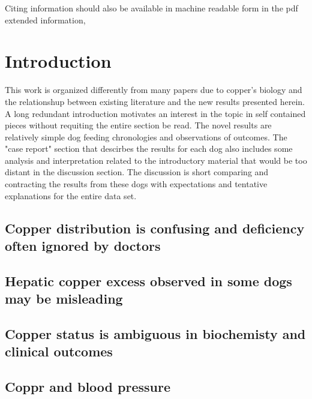 \maketitle
\tableofcontents


\vspace{.5in}
Citing information should also be available in machine readable
form in the pdf extended information, 

\vspace{.3in}

\begin{minipage}{\linewidth}
%
%
\mjmshowbib
\end{minipage}


\newpage
\newcommand{\mjmguide}[1]{ \subsection{#1}}

\section{Introduction  }

This work is organized differently from many papers
due to copper's biology and the relationshup between existing
literature and the new results presented herein.
A long redundant introduction  motivates an interest in the topic
in self contained pieces without requiting the entire section  be read.
The novel results are relatively simple dog feeding chronologies
and observations of outcomes. The "case report" section that
descirbes the results for each dog also includes some analysis
and interpretation related to the   introductory material that would
be too distant in the discussion section. 
The discussion is short  comparing and contracting the results
from these dogs with expectations and tentative explanations for
the entire data set.  

\mjmguide{ Copper distribution is confusing and deficiency often ignored by doctors}

\mjmintro


\mjmguide{ Hepatic copper excess observed in some dogs may be misleading  }

\mjmmislead


\mjmguide{ Copper status is ambiguous in biochemisty and clinical outcomes   }

\mjmambig

\mjmguide{ Coppr and blood pressure   }

